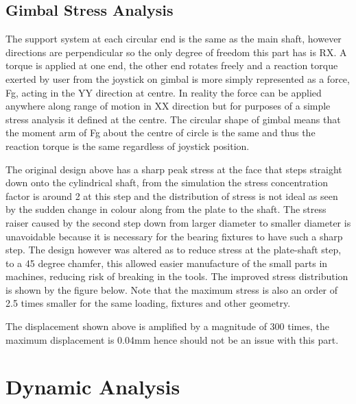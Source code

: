 
\subsection{Gimbal Stress Analysis} %
\label{sub:gimbal_stress_analysis}

The support system at each circular end is the same as the main shaft, however directions are perpendicular so the only degree of freedom this part has is RX. A torque is applied at one end, the other end rotates freely and a reaction torque exerted by user from the joystick on gimbal is more simply represented as a force, Fg, acting in the YY direction at centre. In reality the force can be applied anywhere along range of motion in XX direction but for purposes of a simple stress analysis it defined at the centre. The circular shape of gimbal means that the moment arm of Fg about the centre of circle is the same and thus the reaction torque is the same regardless of joystick position.

The original design above has a sharp peak stress at the face that steps straight down onto the cylindrical shaft, from the simulation the stress concentration factor is around 2 at this step and the distribution of stress is not ideal as seen by the sudden change in colour along from the plate to the shaft. The stress raiser caused by the second step down from larger diameter to smaller diameter is unavoidable because it is necessary for the bearing fixtures to have such a sharp step. The design however was altered as to reduce stress at the plate-shaft step, to a 45 degree chamfer, this allowed easier manufacture of the small parts in machines, reducing risk of breaking in the tools. The improved stress distribution is shown by the figure below. Note that the maximum stress is also an order of 2.5 times smaller for the same loading, fixtures and other geometry.

The displacement shown above is amplified by a magnitude of 300 times, the maximum displacement is 0.04mm hence should not be an issue with this part.




\section{Dynamic Analysis} %
\label{sec:dynamic_analysis}

